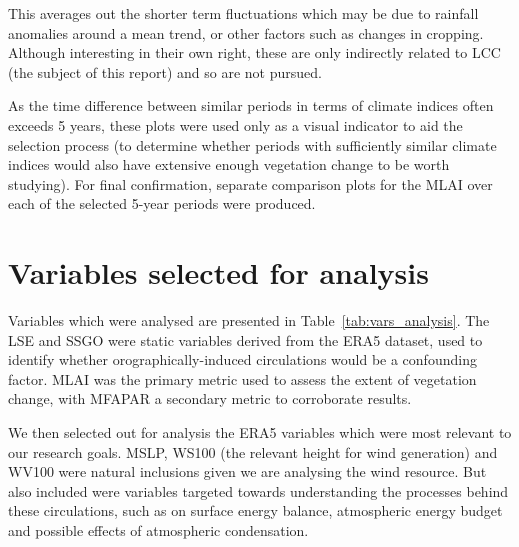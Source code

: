 This averages out the shorter term fluctuations which may be due to rainfall anomalies around a mean trend, or other factors such as changes in cropping. Although interesting in their own right, these are only indirectly related to \ac{LCC} (the subject of this report) and so are not pursued.

As the time difference between similar periods in terms of climate indices often exceeds 5 years, these plots were used only as a visual indicator to aid the selection process (to determine whether periods with sufficiently similar climate indices would also have extensive enough vegetation change to be worth studying). For final confirmation, separate comparison plots for the \ac{MLAI} over each of the selected 5-year periods were produced.

\section{Variables selected for analysis}
\label{sec:method_var}

Variables which were analysed are presented in Table~\ref{tab:vars_analysis}. The \ac{LSE} and \ac{SSGO} were static variables derived from the \ac{ERA5} dataset, used to identify whether orographically-induced circulations would be a confounding factor. \ac{MLAI} was the primary metric used to assess the extent of vegetation change, with \ac{MFAPAR} a secondary metric to corroborate results. 

We then selected out for analysis the \ac{ERA5} variables which were most relevant to our research goals. \ac{MSLP}, \ac{WS100} (the relevant height for wind generation) and \ac{WV100} were natural inclusions given we are analysing the wind resource. But also included were variables targeted towards understanding the processes behind these circulations, such as on surface energy balance, atmospheric energy budget and possible effects of atmospheric condensation.

